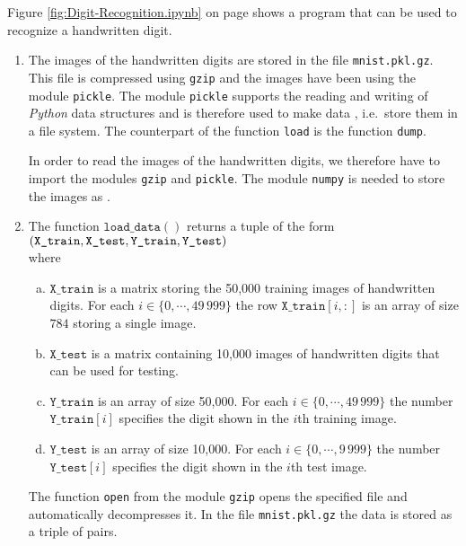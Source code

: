 Figure \ref{fig:Digit-Recognition.ipynb} on page \pageref{fig:Digit-Recognition.ipynb} shows a program that can
be used to recognize a handwritten digit.
\begin{enumerate}
\item The images of the handwritten digits are stored in the file \texttt{mnist.pkl.gz}.  This file is compressed
      using \texttt{gzip} and the images have been  using the module \texttt{pickle}.  The module
      \texttt{pickle} supports the reading and writing of \textsl{Python} data structures and is therefore
      used to make data , i.e.~store them in a file system.  The counterpart of the function
      \texttt{load} is the function \texttt{dump}.

      In order to read the images of the handwritten digits, we therefore have to import the modules
      \texttt{gzip} and \texttt{pickle}.  The module \texttt{numpy} is needed to store the images as . 
\item The function $\texttt{load\_data}()$ returns a tuple of the form
      \\[0.2cm]
      \hspace*{1.3cm}
      $ \displaystyle (\texttt{X\_train}, \texttt{X\_test}, \texttt{Y\_train}, \texttt{Y\_test}) $
      \\[0.2cm]
      where 
      \begin{enumerate}[(a)]
      \item $\texttt{X\_train}$ is a matrix storing the 50,000 training images of handwritten digits.
            For each $i \in \{0,\cdots,49\,999\}$ the row $\texttt{X\_train}[i, :]$ is an array of size $784$ storing a single image.
      \item $\texttt{X\_test}$ is a matrix containing 10,000 images of handwritten digits that can be used for testing.
      \item $\texttt{Y\_train}$ is an array of size 50,000. For each $i \in \{0,\cdots,49\,999\}$ the number $\texttt{Y\_train}[i]$
            specifies the digit shown in the $i$th training image.
      \item $\texttt{Y\_test}$ is an array of size 10,000. For each $i \in \{0,\cdots,9\,999\}$ the number $\texttt{Y\_test}[i]$
            specifies the digit shown in the $i$th test image.
      \end{enumerate}
      The function \texttt{open} from the module \texttt{gzip} opens the specified file and automatically
      decompresses it.  In the file \texttt{mnist.pkl.gz} the data is stored as a triple of pairs.

\end{enumerate}

